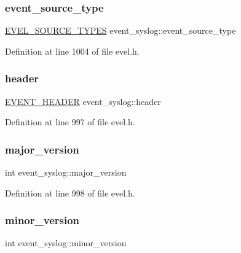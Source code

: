 \subsubsection{\texorpdfstring{event\+\_\+source\+\_\+type}{event\_source\_type}}
{\footnotesize\ttfamily \hyperlink{evel_8h_a304eae0d024005dc4c7031bdd774d64a}{E\+V\+E\+L\+\_\+\+S\+O\+U\+R\+C\+E\+\_\+\+T\+Y\+P\+ES} event\+\_\+syslog\+::event\+\_\+source\+\_\+type}



Definition at line 1004 of file evel.\+h.

\hypertarget{structevent__syslog_a32b365337bcb0b4e2930f8631990b48a}{}\label{structevent__syslog_a32b365337bcb0b4e2930f8631990b48a} 
\subsubsection{\texorpdfstring{header}{header}}
{\footnotesize\ttfamily \hyperlink{evel_8h_aa0ea94c675729365ea7825c4fc7e06d8}{E\+V\+E\+N\+T\+\_\+\+H\+E\+A\+D\+ER} event\+\_\+syslog\+::header}



Definition at line 997 of file evel.\+h.

\hypertarget{structevent__syslog_aa4b7dc9889e88d1bd6e9a0b19b035ee2}{}\label{structevent__syslog_aa4b7dc9889e88d1bd6e9a0b19b035ee2} 
\subsubsection{\texorpdfstring{major\+\_\+version}{major\_version}}
{\footnotesize\ttfamily int event\+\_\+syslog\+::major\+\_\+version}



Definition at line 998 of file evel.\+h.

\hypertarget{structevent__syslog_ab85ca19f0c02ea459250186b48db3778}{}\label{structevent__syslog_ab85ca19f0c02ea459250186b48db3778} 
\subsubsection{\texorpdfstring{minor\+\_\+version}{minor\_version}}
{\footnotesize\ttfamily int event\+\_\+syslog\+::minor\+\_\+version}



